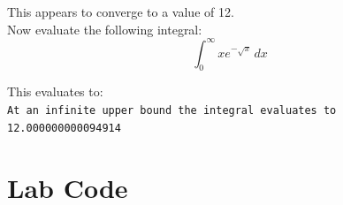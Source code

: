 \documentclass[a4paper,11pt]{article}
\begin{document}
\begin{preview}
\begin{enumerate}
\begin{enumerate}
\begin{enumerate}
        This appears to converge to a value of 12.\\

        Now evaluate the following integral:\\
        $$ \int_{0}^{\infty} xe^{-\sqrt{x}}\,dx $$

        This evaluates to:\\
        \texttt{At an infinite upper bound the integral evaluates to 12.000000000094914}

        \end{enumerate}

    \end{enumerate}
    \section*{Lab Code}
    
\end{enumerate}
\end{preview}
\end{document}
